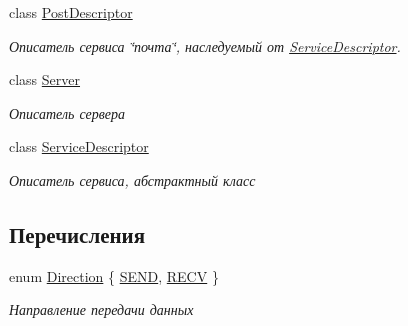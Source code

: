 \begin{DoxyCompactItemize}
class \hyperlink{class_network_service_1_1_post_descriptor}{Post\+Descriptor}
\begin{DoxyCompactList}\small\item\em Описатель сервиса \char`\"{}почта\char`\"{}, наследуемый от \hyperlink{class_network_service_1_1_service_descriptor}{Service\+Descriptor}. \end{DoxyCompactList}\item 
class \hyperlink{class_network_service_1_1_server}{Server}
\begin{DoxyCompactList}\small\item\em Описатель сервера \end{DoxyCompactList}\item 
class \hyperlink{class_network_service_1_1_service_descriptor}{Service\+Descriptor}
\begin{DoxyCompactList}\small\item\em Описатель сервиса, абстрактный класс \end{DoxyCompactList}\end{DoxyCompactItemize}
\subsection*{Перечисления}
\begin{DoxyCompactItemize}
\item 
enum \hyperlink{namespace_network_service_abe1196dad9e8afcbc5c6b38196ce2c65}{Direction} \{ \hyperlink{namespace_network_service_abe1196dad9e8afcbc5c6b38196ce2c65aba432dcf573f50b84f5ed73af5d4a1d1}{S\+E\+N\+D}, 
\hyperlink{namespace_network_service_abe1196dad9e8afcbc5c6b38196ce2c65ad723a3e2a611f41c5add1e872173dc45}{R\+E\+C\+V}
 \}
\begin{DoxyCompactList}\small\item\em Направление передачи данных \end{DoxyCompactList}\end{DoxyCompactItemize}
